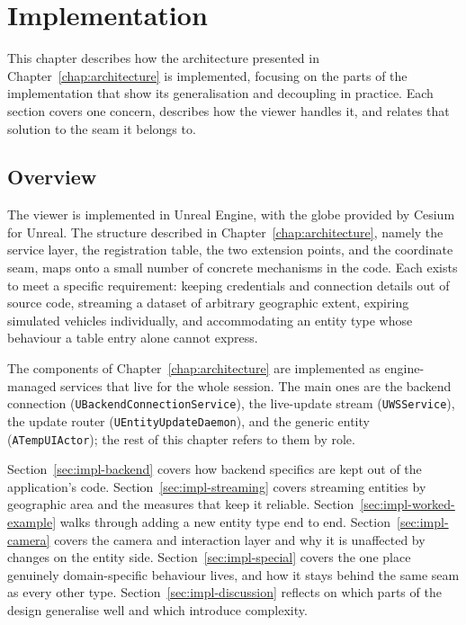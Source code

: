 \chapter{Implementation}
\label{chap:implementation}

\begin{introduction}
This chapter describes how the architecture presented in Chapter~\ref{chap:architecture} is implemented, focusing on the parts of the implementation that show its generalisation and decoupling in practice. Each section covers one concern, describes how the viewer handles it, and relates that solution to the seam it belongs to.
\end{introduction}

\section{Overview}
\label{sec:impl-overview}

The viewer is implemented in Unreal Engine, with the globe provided by Cesium for Unreal. The structure described in Chapter~\ref{chap:architecture}, namely the service layer, the registration table, the two extension points, and the coordinate seam, maps onto a small number of concrete mechanisms in the code. Each exists to meet a specific requirement: keeping credentials and connection details out of source code, streaming a dataset of arbitrary geographic extent, expiring simulated vehicles individually, and accommodating an entity type whose behaviour a table entry alone cannot express.

The components of Chapter~\ref{chap:architecture} are implemented as engine-managed services that live for the whole session. The main ones are the backend connection (\texttt{UBackend\-Connection\-Service}), the live-update stream (\texttt{UWSService}), the update router (\texttt{UEntityUpdateDaemon}), and the generic entity (\texttt{ATempUIActor}); the rest of this chapter refers to them by role.

Section~\ref{sec:impl-backend} covers how backend specifics are kept out of the application's code. Section~\ref{sec:impl-streaming} covers streaming entities by geographic area and the measures that keep it reliable. Section~\ref{sec:impl-worked-example} walks through adding a new entity type end to end. Section~\ref{sec:impl-camera} covers the camera and interaction layer and why it is unaffected by changes on the entity side. Section~\ref{sec:impl-special} covers the one place genuinely domain-specific behaviour lives, and how it stays behind the same seam as every other type. Section~\ref{sec:impl-discussion} reflects on which parts of the design generalise well and which introduce complexity.

